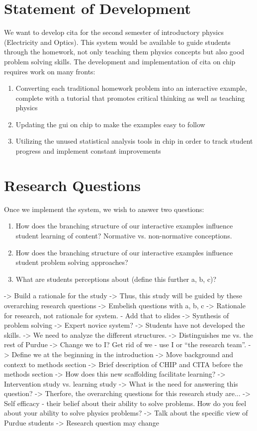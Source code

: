 \section{Statement of Development}

We want to develop \gls{cita} for the second semester of introductory physics (Electricity and Optics). This system would be available to guide students through the homework, not only teaching them physics concepts but also good problem solving skills. The development and implementation of \gls{cita} on \gls{chip} requires work on many fronts:

\begin{enumerate}
\item Converting each traditional homework problem into an interactive example, complete with a tutorial that promotes critical thinking as well as teaching physics
\item Updating the \gls{gui} on \gls{chip} to make the examples easy to follow
\item Utilizing the unused statistical analysis tools in \gls{chip} in order to track student progress and implement constant improvements
\end{enumerate}

\section{Research Questions}

Once we implement the system, we wish to answer two questions:

\begin{enumerate}
\item How does the branching structure of our interactive examples influence student learning of content? Normative vs. non-normative conceptions.
\item How does the branching structure of our interactive examples influence student problem solving approaches?
\item What are students perceptions about (define this further a, b, c)?
\end{enumerate}

-> Build a rationale for the study
-> Thus, this study will be guided by these overarching research questions
-> Embelish questions with a, b, c
-> Rationale for research, not rationale for system. - Add that to slides
-> Synthesis of problem solving
-> Expert novice system?
-> Students have not developed the skills.
-> We need to analyze the different structures.
-> Distinguishes me vs. the rest of Purdue
-> Change we to I? Get rid of we - use I or ``the research team''.
-> Define we at the beginning in the introduction
-> Move background and context to methods section
-> Brief description of CHIP and CITA before the methods section
-> How does this new scaffolding facilitate learning?
-> Intervention study vs. learning study
-> What is the need for answering this question?
-> Therfore, the overarching questions for this research study are...
-> Self efficacy - their belief about their ability to solve problems. How do you feel about your ability to solve physics problems?
-> Talk about the specific view of Purdue students
-> Research question may change